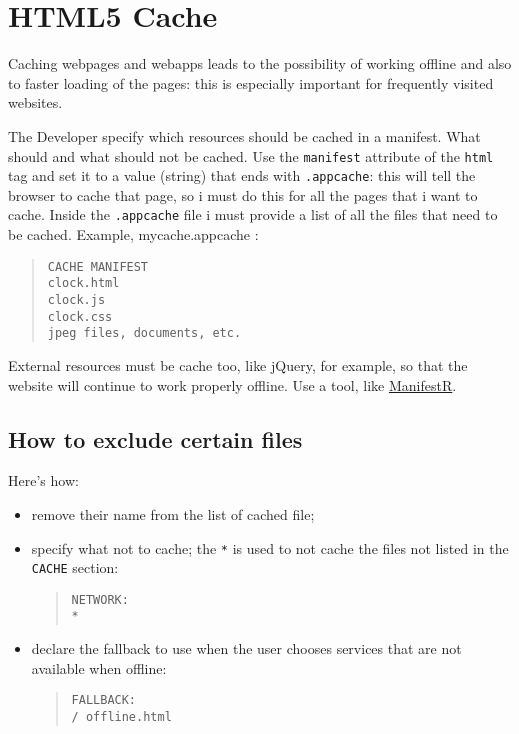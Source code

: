\documentclass[a4paper,11pt]{book}
\begin{document}
\section{HTML5 Cache}
Caching webpages and webapps leads to the possibility of working offline and also to
faster loading of the pages: this is especially important for frequently visited
websites.

The Developer specify which resources should be cached in a manifest. What should
and what should not be cached. Use the \texttt{manifest} attribute of the
\texttt{html} tag and set it to
a value (string) that ends with \texttt{.appcache}: this will tell the browser to
cache that page, so i must do this for all the pages that i want to cache.
Inside the \texttt{.appcache} file i must provide a list of all the files that
need to be cached. Example, mycache.appcache :
\begin{verse}
\begin{verbatim}
CACHE MANIFEST
clock.html
clock.js
clock.css
jpeg files, documents, etc.
\end{verbatim}
\end{verse}
External resources must be cache too, like jQuery, for example, so that the website
will continue to work properly offline. Use a tool, like
\href{http://westciv.com/tools/manifestR/}{ManifestR}.
\subsection{How to exclude certain files}
Here's how:
\begin{itemize}
\item remove their name from the list of cached file;
\item specify what not to cache; the \texttt{*} is used to not cache the files not listed in
the \texttt{CACHE} section:
	\begin{verse}
	\texttt{NETWORK:} \\ \texttt{*}
	\end{verse}
\item declare the fallback to use when the user chooses
services that are not available when offline:
	\begin{verse}
	\texttt{FALLBACK:} \\ \texttt{/ offline.html}
	\end{verse}
\end{itemize}
\end{document}
